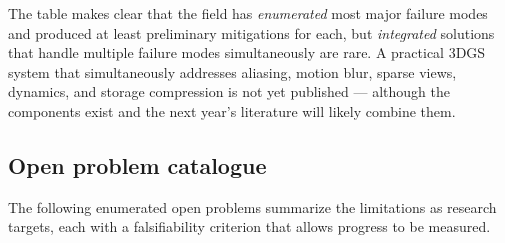 \documentclass{article}
\begin{document}
The table makes clear that the field has \emph{enumerated} most major failure modes and produced at least preliminary mitigations for each, but \emph{integrated} solutions that handle multiple failure modes simultaneously are rare. A practical 3DGS system that simultaneously addresses aliasing, motion blur, sparse views, dynamics, and storage compression is not yet published --- although the components exist and the next year's literature will likely combine them.

\subsection{Open problem catalogue}\label{open-problem-catalogue}

The following enumerated open problems summarize the limitations as research targets, each with a falsifiability criterion that allows progress to be measured.
\end{document}
